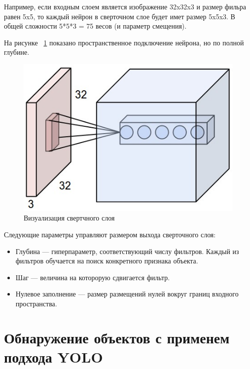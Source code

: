 \documentclass[a4paper,english,russian]{G2-105}
\begin{document}
\par Например, если входным слоем является изображение 32x32x3 и размер фильра равен 5x5, то каждый нейрон в сверточном слое будет имет размер 5x5x3. В общей сложности 5*5*3 = 75 весов (и параметр смещения). 
\par На рисунке ~\ref{depthcol} показано пространственное подключение нейрона, но по полной глубине. 
\begin{figure}
    \includegraphics[width=0.5\linewidth]{depthcol.png}
    \caption{Визуализация свертчного слоя}
	\label{depthcol}
\end{figure}
\par Следующие параметры управляют размером выхода сверточного слоя:
\begin{itemize}
\item Глубина --- гиперпараметр, соответствующий числу фильтров. Каждый из фильтров обучается на поиск конкретного признака объекта.
\item Шаг --- величина на которорую сдвигается фильтр.
\item Нулевое заполнение --- размер размещений нулей вокруг границ входного пространства.
\end{itemize}
\ttl
\section{Обнаружение объектов с применем подхода YOLO}
\end{document}
